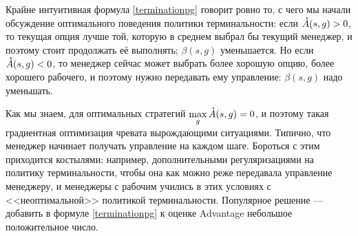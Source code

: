 Крайне интуитивная формула \eqref{terminationpg} говорит ровно то, с чего мы начали обсуждение оптимального поведения политики терминальности: если $\manager{A}(s, g) \HM> 0$, то текущая опция лучше той, которую в среднем выбрал бы текущий менеджер, и поэтому стоит продолжать её выполнять; $\beta(s, g)$ уменьшается. Но если $\accentset{\star}{A}(s, g) < 0$, то менеджер сейчас может выбрать более хорошую опцию, более хорошего рабочего, и поэтому нужно передавать ему управление: $\beta(s, g)$ надо уменьшать.

Как мы знаем, для оптимальных стратегий $\max\limits_{g} \accentset{\star}{A}(s, g) = 0$, и поэтому такая градиентная оптимизация чревата вырождающими ситуациями. Типично, что менеджер начинает получать управление на каждом шаге. Бороться с этим приходится костылями: например, дополнительными регуляризациями на политику терминальности, чтобы она как можно реже передавала управление менеджеру, и менеджеры с рабочим учились в этих условиях с <<неоптимальной>> политикой терминальности. Популярное решение --- добавить в формуле \eqref{terminationpg} к оценке Advantage небольшое положительное число.




